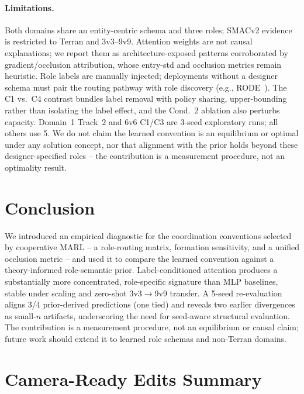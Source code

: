 \documentclass{nextgame2026}
\begin{document}
\paragraph{Limitations.} Both domains share an entity-centric schema and three roles; SMACv2 evidence is restricted to Terran and 3v3--9v9. Attention weights are not causal explanations; we report them as architecture-exposed patterns corroborated by gradient/occlusion attribution, whose entry-std and occlusion metrics remain heuristic. Role labels are manually injected; deployments without a designer schema must pair the routing pathway with role discovery (e.g., RODE~\cite{rode2021}). The C1 vs.\ C4 contrast bundles label removal with policy sharing, upper-bounding rather than isolating the label effect, and the Cond.~2 ablation also perturbs capacity. Domain~1 Track~2 and 6v6 C1/C3 are 3-seed exploratory runs; all others use 5. We do not claim the learned convention is an equilibrium or optimal under any solution concept, nor that alignment with the prior holds beyond these designer-specified roles -- the contribution is a measurement procedure, not an optimality result.

\section{Conclusion}
\label{sec:conclusion}

We introduced an empirical diagnostic for the coordination conventions selected by cooperative MARL -- a role-routing matrix, formation sensitivity, and a unified occlusion metric -- and used it to compare the learned convention against a theory-informed role-semantic prior. Label-conditioned attention produces a substantially more concentrated, role-specific signature than MLP baselines, stable under scaling and zero-shot 3v3$\to$9v9 transfer. A 5-seed re-evaluation aligns 3/4 prior-derived predictions (one tied) and reveals two earlier divergences as small-$n$ artifacts, underscoring the need for seed-aware structural evaluation. The contribution is a measurement procedure, not an equilibrium or causal claim; future work should extend it to learned role schemas and non-Terran domains.





\clearpage
\section*{Camera-Ready Edits Summary}
\end{document}

